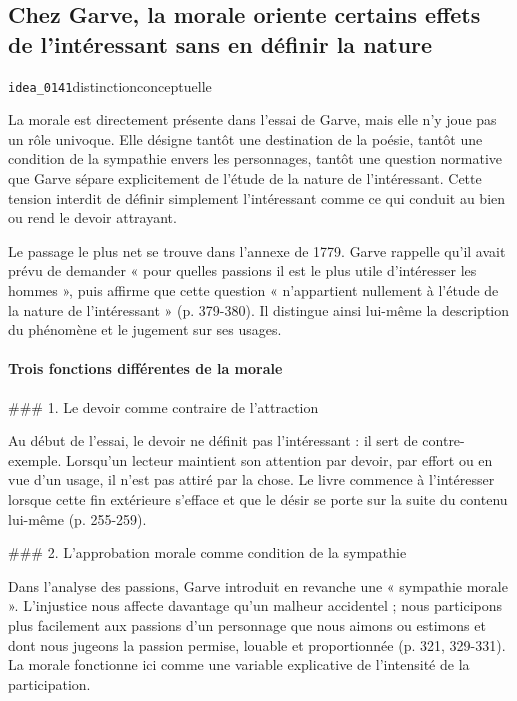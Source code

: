 \documentclass[10pt,a4paper]{article}
\begin{document}
\subsection{Chez Garve, la morale oriente certains effets de l'intéressant sans en définir la nature}
{\small\color{metadata} \texttt{idea\_0141}\quad\textbullet\quad distinction\quad\textbullet\quad conceptuelle\par}

La morale est directement présente dans l'essai de Garve, mais elle n'y joue pas un rôle univoque. Elle désigne tantôt une destination de la poésie, tantôt une condition de la sympathie envers les personnages, tantôt une question normative que Garve sépare explicitement de l'étude de la nature de l'intéressant. Cette tension interdit de définir simplement l'intéressant comme ce qui conduit au bien ou rend le devoir attrayant.

Le passage le plus net se trouve dans l'annexe de 1779. Garve rappelle qu'il avait prévu de demander « pour quelles passions il est le plus utile d'intéresser les hommes », puis affirme que cette question « n'appartient nullement à l'étude de la nature de l'intéressant » (p. 379-380). Il distingue ainsi lui-même la description du phénomène et le jugement sur ses usages.

\paragraph{Trois fonctions différentes de la morale}
\#\#\# 1. Le devoir comme contraire de l'attraction

Au début de l'essai, le devoir ne définit pas l'intéressant : il sert de contre-exemple. Lorsqu'un lecteur maintient son attention par devoir, par effort ou en vue d'un usage, il n'est pas attiré par la chose. Le livre commence à l'intéresser lorsque cette fin extérieure s'efface et que le désir se porte sur la suite du contenu lui-même (p. 255-259).

\#\#\# 2. L'approbation morale comme condition de la sympathie

Dans l'analyse des passions, Garve introduit en revanche une « sympathie morale ». L'injustice nous affecte davantage qu'un malheur accidentel ; nous participons plus facilement aux passions d'un personnage que nous aimons ou estimons et dont nous jugeons la passion permise, louable et proportionnée (p. 321, 329-331). La morale fonctionne ici comme une variable explicative de l'intensité de la participation.
\end{document}

